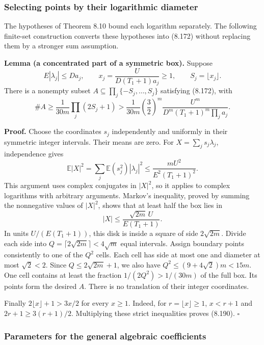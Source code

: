 \documentclass[
  11pt,
  a4paper,
]{article}
\begin{document}
\subsubsection{Selecting points by their logarithmic
diameter}\label{selecting-points-by-their-logarithmic-diameter}

The hypotheses of Theorem 8.10 bound each logarithm separately. The
following finite-set construction converts these hypotheses into (8.172)
without replacing them by a stronger sum assumption.

\textbf{Lemma (a concentrated part of a symmetric box).} Suppose \[
E|\lambda_j|\le Da_j,\qquad
x_j=\frac{U}{D(T_1+1)a_j}\ge1,\qquad S_j=\lfloor x_j\rfloor.
\] There is a nonempty subset \(A\subseteq\prod_j\{-S_j,\ldots,S_j\}\)
satisfying (8.172), with \[
\#A\ge\frac1{30m}\prod_j(2S_j+1)
>\frac1{30m}\left(\frac32\right)^m
\frac{U^m}{D^m(T_1+1)^m\prod_ja_j}.
\tag{8.190}
\]

\textbf{Proof.} Choose the coordinates \(s_j\) independently and
uniformly in their symmetric integer intervals. Their means are zero.
For \(X=\sum_js_j\lambda_j\), independence gives \[
\mathbb E|X|^2
=\sum_j\mathbb E(s_j^2)|\lambda_j|^2
\le\frac{mU^2}{E^2(T_1+1)^2}.
\] This argument uses complex conjugates in \(|X|^2\), so it applies to
complex logarithms with arbitrary arguments. Markov's inequality, proved
by summing the nonnegative values of \(|X|^2\), shows that at least half
the box lies in \[
|X|\le\frac{\sqrt{2m}\,U}{E(T_1+1)}.
\] In units \(U/(E(T_1+1))\), this disk is inside a square of side
\(2\sqrt{2m}\). Divide each side into
\(Q=\lceil2\sqrt{2m}\rceil<4\sqrt m\) equal intervals. Assign boundary
points consistently to one of the \(Q^2\) cells. Each cell has side at
most one and diameter at most \(\sqrt2<2\). Since \(Q\le2\sqrt{2m}+1\),
we also have \(Q^2\le(9+4\sqrt2)m<15m\). One cell contains at least the
fraction \(1/(2Q^2)>1/(30m)\) of the full box. Its points form the
desired \(A\). There is no translation of their integer coordinates.

Finally \(2\lfloor x\rfloor+1>3x/2\) for every \(x\ge1\). Indeed, for
\(r=\lfloor x\rfloor\ge1\), \(x<r+1\) and \(2r+1\ge3(r+1)/2\).
Multiplying these strict inequalities proves (8.190). \(\square\)

\subsubsection{Parameters for the general algebraic
coefficients}\label{parameters-for-the-general-algebraic-coefficients}
\end{document}
